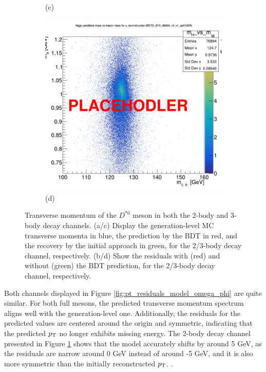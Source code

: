 \begin{myitemlist}
\begin{figure}[!ht]
\begin{subfigure}[t]{0.50\mylength}
            \caption{\footnotesize (c)}
        \end{subfigure}%
        \begin{subfigure}[t]{0.50\mylength}
            \centering
            \includegraphics[width=0.45\mylength]{resources/plots/PLACEHOLDER.png}
            \caption{\footnotesize (d)}
        \end{subfigure}%
    \caption{Transverse momentum of the $D^{*0}$ meson in both the 2-body and 3-body decay channels. (a/c) Display the generation-level MC transverse momenta in blue, the prediction by the BDT in red, and the recovery by the initial approach in green, for the 2/3-body decay channel, respectively. (b/d) Show the residuals with (red) and without (green) the BDT prediction, for the 2/3-body decay channel, respectively.}
    \label{fig:pt_residuals_model_d0star}
        \vspace*{-0.0cm}
    \end{figure}

    Both channels displayed in Figure \ref{fig:pt_residuals_model_omega_phi} are quite similar. For both full mesons, the predicted transverse momentum spectrum aligns well with the generation-level one. Additionally, the residuals for the predicted values are centered around the origin and symmetric, indicating that the predicted $p_\text{T}$ no longer exhibits missing energy. The 2-body decay channel presented in Figure \ref{fig:pt_residuals_model_d0star} shows that the model accurately shifts by around 5 GeV, as the residuals are narrow around 0 GeV instead of around -5 GeV, and it is also more symmetric than the initially reconstructed $p_\text{T}$. .


\end{myitemlist}
